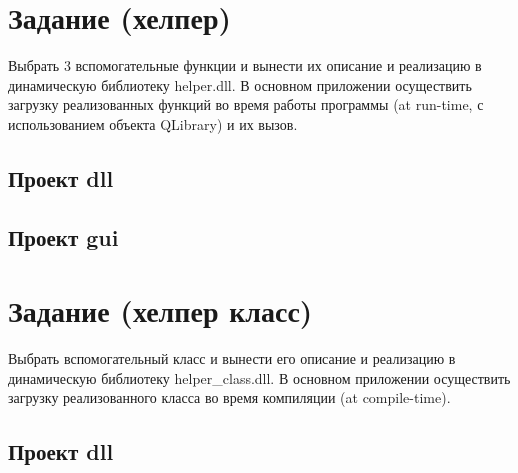 
\section{Задание (хелпер)}

Выбрать 3 вспомогательные функции и вынести их описание и реализацию в динамическую библиотеку helper.dll.
В основном приложении осуществить загрузку реализованных функций во время работы программы
(at run-time, с использованием объекта QLibrary) и их вызов.

\subsection{Проект dll}









\subsection{Проект gui}




\newpage

\section{Задание (хелпер класс)}

Выбрать вспомогательный класс и вынести его описание и реализацию в динамическую библиотеку helper\_class.dll.
В основном приложении осуществить загрузку реализованного класса во время компиляции (at compile-time).

\subsection{Проект dll}



